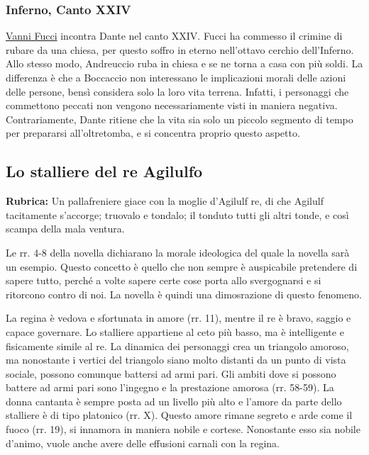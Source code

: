 \documentclass[a4paper]{article}
\begin{document}
\subsubsection{Inferno, Canto XXIV}

\href{https://en.wikipedia.org/wiki/Vanni_Fucci}{Vanni Fucci}
incontra Dante nel canto XXIV. Fucci ha commesso il crimine di
rubare da una chiesa, per questo soffro in eterno nell'ottavo cerchio dell'Inferno.
Allo stesso modo, Andreuccio ruba in chiesa e se ne torna a casa con più soldi.
La differenza è che a Boccaccio non interessano le implicazioni morali delle azioni
delle persone, bensì considera solo la loro vita terrena.
Infatti, i personaggi che commettono peccati non vengono necessariamente visti
in maniera negativa.
Contrariamente, Dante ritiene che la vita sia solo un piccolo segmento di tempo
per prepararsi all'oltretomba, e si concentra proprio questo aspetto.

\pagebreak

\subsection{Lo stalliere del re Agilulfo}

\textbf{Rubrica:} Un pallafreniere giace con la moglie d'Agilulf re, di che Agilulf tacitamente s'accorge; truovalo e tondalo; il tonduto tutti gli altri tonde, e così scampa della mala ventura.


Le rr. 4-8 della novella dichiarano la morale ideologica del quale la novella sarà un esempio.
Questo concetto è quello che non sempre è auspicabile pretendere di sapere tutto,
perché a volte sapere certe cose porta allo svergognarsi e si ritorcono contro di noi.
La novella è quindi una dimosrazione di questo fenomeno.

La regina è vedova e sfortunata in amore (rr. 11),
mentre il re è bravo, saggio e capace governare.
Lo stalliere appartiene al ceto più basso, ma è intelligente e fisicamente simile al re.
La dinamica dei personaggi crea un triangolo amoroso, ma nonostante
i vertici del triangolo siano molto distanti da un punto di vista sociale, possono comunque battersi ad armi pari.
Gli ambiti dove si possono battere ad armi pari sono l'ingegno e la prestazione amorosa (rr. 58-59).
La donna cantanta è sempre posta ad un livello più alto e l'amore da parte dello stalliere
è di tipo platonico (rr. X).
Questo amore rimane segreto e arde come il fuoco (rr. 19), si innamora in maniera nobile e
cortese. Nonostante esso sia nobile d'animo, vuole anche avere delle effusioni carnali con la regina.
\end{document}
